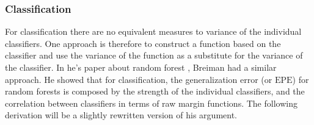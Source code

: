 \subsubsection{Classification}
\label{sub:Classification}
For classification there are no equivalent measures to variance of the individual classifiers. One approach is therefore to construct a function based on the classifier and use the variance of the function as a substitute for the variance of the classifier. 
In he's paper about random forest \cite{randomforests}, Breiman had a similar approach. He showed that for classification, the generalization error (or $\mathrm{EPE}$) for random forests is composed by the strength of the individual classifiers, and the correlation between classifiers in terms of raw margin functions. 
The following derivation will be a slightly rewritten version of his argument.

